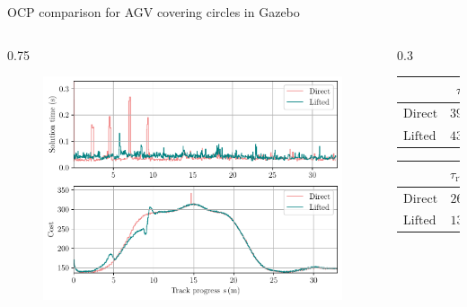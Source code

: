 \documentclass[10pt,aspectratio=1610]{beamer} %
\begin{document}
\begin{frame}{OCP comparison for AGV covering circles in Gazebo}
	\begin{columns}[onlytextwidth]
	\begin{column}{0.75\textwidth}
	\begin{figure}[h!tbp]
		\includegraphics[scale=0.65]{figures/metrics}
		\end{figure}
	\end{column}
	\begin{column}{0.3\textwidth}
		\begin{table}[h!tbp]
			\small
			\begin{center}
				\begin{tabular}{lccccl}\toprule
					& $\tau_{\mathrm{rti,\,avg}}$\\
					\midrule
					$\mathrm{Direct}$& $39.90\,\mathrm{ms}$\\
					$\mathrm{Lifted}$& $43.92\,\mathrm{ms}$\\
					\bottomrule
				\end{tabular}
			\end{center}
		\end{table}

		\begin{table}[h!tbp]
			\small
			\begin{center}
				\begin{tabular}{lccccl}\toprule
					& $\tau_{\mathrm{rti,\,max}}$\\
					\midrule
					$\mathrm{Direct}$& $269\,\mathrm{ms}$\\
					$\mathrm{Lifted}$& $134\,\mathrm{ms}$\\
					\bottomrule
				\end{tabular}
			\end{center}
		\end{table}
	\end{column}
	\end{columns}
\end{frame}
\end{document}
